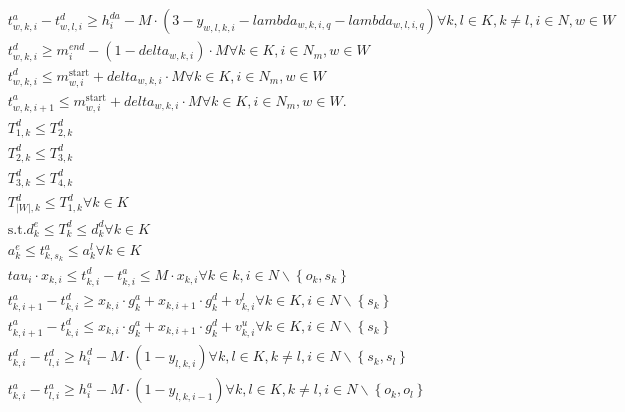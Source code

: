 \begin{align}
  & t_{w , k , i}^{a} - t_{w , l , i}^{d} \geq h_{i}^{d a} - M \cdot \left(3 - y_{w , l , k , i} - \mathit{lambda}_{w , k , i , q} - \mathit{lambda}_{w , l , i , q}\right) \forall k , l \in K , k \neq l , i \in N , w \in W \tag{eq\_0014} \\
  & t_{w , k , i}^{d} \geq m_{i}^{end} - \left(1 - \mathit{delta}_{w , k , i}\right) \cdot M \forall k \in K , i \in N_{m} , w \in W \tag{eq\_0015} \\
  & t_{w , k , i}^{d} \leq m_{w , i}^{\text{start}} + \mathit{delta}_{w , k , i} \cdot M \forall k \in K , i \in N_{m} , w \in W \tag{eq\_0017} \\
  & t_{w , k , i + 1}^{a} \leq m_{w , i}^{\text{start}} + \mathit{delta}_{w , k , i} \cdot M \forall k \in K , i \in N_{m} , w \in W . \tag{eq\_0018} \\
  & T_{1,k}^{d} \leq T_{2,k}^{d} \tag{eq\_0020\_a} \\
  & T_{2,k}^{d} \leq T_{3,k}^{d} \tag{eq\_0020\_b} \\
  & T_{3,k}^{d} \leq T_{4,k}^{d} \tag{eq\_0020\_c} \\
  & T_{|W|,k}^{d} \leq T_{1,k}^{d} \forall k \in K \tag{eq\_0020\_d} \\
  & \text{s}.\text{t}. d_{k}^{e} \leq T_{k}^{d} \leq d_{k}^{d} \forall k \in K \tag{eq\_0029} \\
  & a_{k}^{e} \leq t_{k , s_{k}}^{a} \leq a_{k}^{l} \forall k \in K \tag{eq\_0030} \\
  & \mathit{tau}_{i} \cdot x_{k , i} \leq t_{k , i}^{d} - t_{k , i}^{a} \leq M \cdot x_{k , i} \forall k \in k , i \in N \backslash \left\{o_{k} , s_{k}\right\} \tag{eq\_0031} \\
  & t_{k , i + 1}^{a} - t_{k , i}^{d} \geq x_{k , i} \cdot g_{k}^{a} + x_{k , i + 1} \cdot g_{k}^{d} + v_{k , i}^{l} \forall k \in K , i \in N \backslash \left\{s_{k}\right\} \tag{eq\_0032} \\
  & t_{k , i + 1}^{a} - t_{k , i}^{d} \leq x_{k , i} \cdot g_{k}^{a} + x_{k , i + 1} \cdot g_{k}^{d} + v_{k , i}^{u} \forall k \in K , i \in N \backslash \left\{s_{k}\right\} \tag{eq\_0033} \\
  & t_{k , i}^{d} - t_{l , i}^{d} \geq h_{i}^{d} - M \cdot \left(1 - y_{l , k , i}\right) \forall k , l \in K , k \neq l , i \in N \backslash \left\{s_{k} , s_{l}\right\} \tag{eq\_0034} \\
  & t_{k , i}^{a} - t_{l , i}^{a} \geq h_{i}^{a} - M \cdot \left(1 - y_{l , k , i - 1}\right) \forall k , l \in K , k \neq l , i \in N \backslash \left\{o_{k} , o_{l}\right\} \tag{eq\_0035} \\

\end{align}
